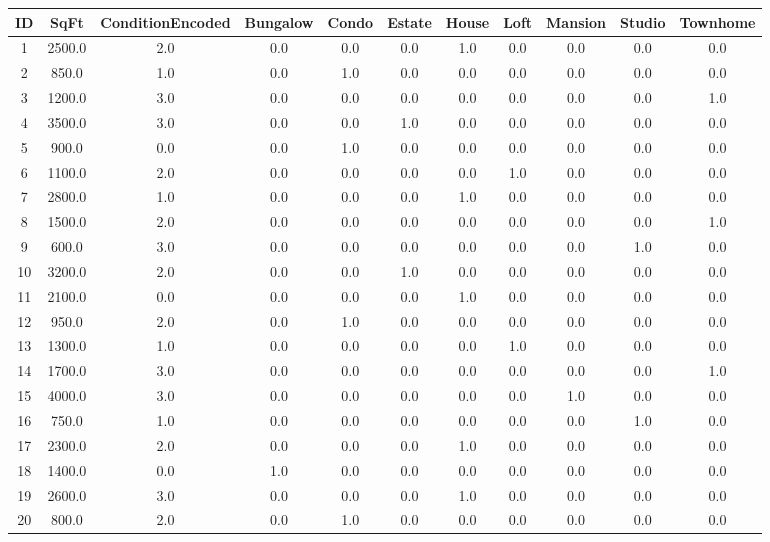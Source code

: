 \documentclass[11pt]{article}
\begin{document}
\begin{center}
\scriptsize
\begin{longtable}{c c c c c c c c c c c}
\toprule
ID & SqFt & ConditionEncoded & Bungalow & Condo & Estate & House & Loft & Mansion & Studio & Townhome \\
\midrule
1  & 2500.0 & 2.0 & 0.0 & 0.0 & 0.0 & 1.0 & 0.0 & 0.0 & 0.0 & 0.0 \\
2  & 850.0  & 1.0 & 0.0 & 1.0 & 0.0 & 0.0 & 0.0 & 0.0 & 0.0 & 0.0 \\
3  & 1200.0 & 3.0 & 0.0 & 0.0 & 0.0 & 0.0 & 0.0 & 0.0 & 0.0 & 1.0 \\
4  & 3500.0 & 3.0 & 0.0 & 0.0 & 1.0 & 0.0 & 0.0 & 0.0 & 0.0 & 0.0 \\
5  & 900.0  & 0.0 & 0.0 & 1.0 & 0.0 & 0.0 & 0.0 & 0.0 & 0.0 & 0.0 \\
6  & 1100.0 & 2.0 & 0.0 & 0.0 & 0.0 & 0.0 & 1.0 & 0.0 & 0.0 & 0.0 \\
7  & 2800.0 & 1.0 & 0.0 & 0.0 & 0.0 & 1.0 & 0.0 & 0.0 & 0.0 & 0.0 \\
8  & 1500.0 & 2.0 & 0.0 & 0.0 & 0.0 & 0.0 & 0.0 & 0.0 & 0.0 & 1.0 \\
9  & 600.0  & 3.0 & 0.0 & 0.0 & 0.0 & 0.0 & 0.0 & 0.0 & 1.0 & 0.0 \\
10 & 3200.0 & 2.0 & 0.0 & 0.0 & 1.0 & 0.0 & 0.0 & 0.0 & 0.0 & 0.0 \\
11 & 2100.0 & 0.0 & 0.0 & 0.0 & 0.0 & 1.0 & 0.0 & 0.0 & 0.0 & 0.0 \\
12 & 950.0  & 2.0 & 0.0 & 1.0 & 0.0 & 0.0 & 0.0 & 0.0 & 0.0 & 0.0 \\
13 & 1300.0 & 1.0 & 0.0 & 0.0 & 0.0 & 0.0 & 1.0 & 0.0 & 0.0 & 0.0 \\
14 & 1700.0 & 3.0 & 0.0 & 0.0 & 0.0 & 0.0 & 0.0 & 0.0 & 0.0 & 1.0 \\
15 & 4000.0 & 3.0 & 0.0 & 0.0 & 0.0 & 0.0 & 0.0 & 1.0 & 0.0 & 0.0 \\
16 & 750.0  & 1.0 & 0.0 & 0.0 & 0.0 & 0.0 & 0.0 & 0.0 & 1.0 & 0.0 \\
17 & 2300.0 & 2.0 & 0.0 & 0.0 & 0.0 & 1.0 & 0.0 & 0.0 & 0.0 & 0.0 \\
18 & 1400.0 & 0.0 & 1.0 & 0.0 & 0.0 & 0.0 & 0.0 & 0.0 & 0.0 & 0.0 \\
19 & 2600.0 & 3.0 & 0.0 & 0.0 & 0.0 & 1.0 & 0.0 & 0.0 & 0.0 & 0.0 \\
20 & 800.0  & 2.0 & 0.0 & 1.0 & 0.0 & 0.0 & 0.0 & 0.0 & 0.0 & 0.0 \\
\bottomrule
\end{longtable}
\end{center}
\end{document}
